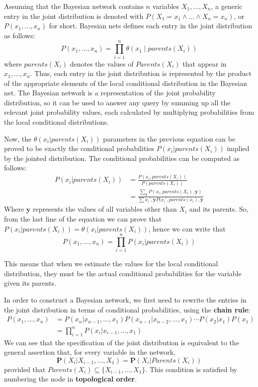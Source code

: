 \documentclass{article}
\begin{document}
Assuming that the Bayesian network contains $n$ variables $X_1, ..., X_n$, a generic entry in the joint distribution is denoted with $P(X_1=x_1\land...\land X_n=x_n)$, or $P(x_1,...,x_n)$ for short. Bayesian nets defines each entry in the joint distribution as follows:
$$P(x_1,...,x_n) = \prod_{i=1}^{n}\theta(x_1\;|\;parents(X_i))$$
where $parents(X_i)$ denotes the values of $Parents(X_i)$ that appear in $x_1, ..., x_n$. Thus, each entry in the joint distribution is represented by the product of the appropriate elements of the local conditional distribution in the Bayesian net. The Bayesian network is a representation of the joint probability distribution, so it can be used to answer any query by summing up all the relevant joint probability values, each calculated by multiplying probabilities from the local conditional distributions. 

Now, the $\theta(x_i|parents(X_i))$ parameters in the previous equation can be proved to be exactly the conditional probabilities $P(x_i|parents(X_i))$ implied by the jointed distribution. The conditional probabilities can be computed as follows:
\begin{align*}
    P(x_i|parents(X_i)) &= \frac{P(x_i, parents(X_i))}{P(parents(X_i))}\\
                        &= \frac{\sum_\textbf{y}P(x_i, parents(X_i),\textbf{y})}{\sum x_i',\textbf{y} P(x_i', parents(x_i), \textbf{y}}
\end{align*}
\clearpage
Where $\textbf{y}$ represents the values of all variables other than $X_i$ and its parents. So, from the last line of the equation we can prove that $P(x_i|parents(X_i)) = \theta(x_i|parents(X_i))$, hence we can write that
$$P(x_1,...,x_n) = \prod_{i=1}^nP(x_i|parents(X_i))$$

This means that when we estimate the values for the local conditional distribution, they must be the actual conditional probabilities for the variable given its parents. 

In order to construct a Bayesian network, we first need to rewrite the entries in the joint distribution in terms of conditional probabilities, using the \textbf{chain rule}:
\begin{align*}
P(x_1,...,x_n) &= P(x_n|x_{n-1},...,x_1)P(x_{n-1}|x_{n-2},...,x_1)\cdots P(x_2|x_1)P(x_1) \\
               &= \prod_{i=1}^nP(x_i|x_{i-1},...,x_1)
\end{align*}
We can see that the specification of the joint distribution is equivalent to the general assertion that, for every variable in the network,
$$\textbf{P}(X_i|X_{i-1},...,X_1)= \textbf{P}(X_i|Parents(X_i))$$
provided that $Parents(X_i) \subseteq \{X_{i-1},...,X_1\}$. This condition is satisfied by numbering the node in \textbf{topological order}.
\end{document}
